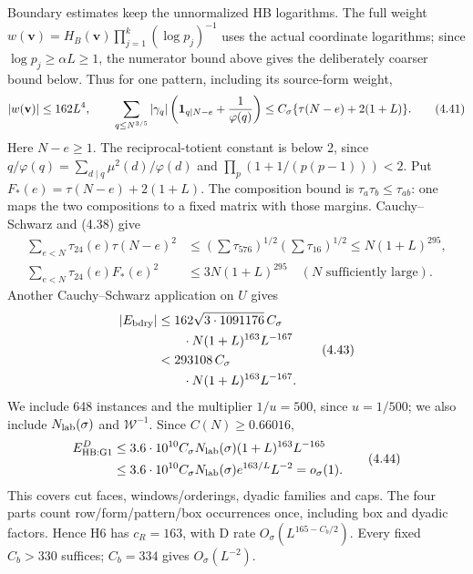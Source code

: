 Boundary estimates keep the unnormalized HB logarithms.
The full weight $w(\mathbf v)=H_B(\mathbf v)\prod_{j=1}^k(\log p_j)^{-1}$
uses the actual coordinate logarithms; since $\log p_j\ge\alpha L\ge1$,
the numerator bound above gives the deliberately coarser bound below.
Thus for one pattern, including its source-form weight,
\[
 |w(\mathbf v)|\le162L^4,\qquad
 \sum_{q\le N^{3/5}}|\gamma_q|
  \left(\mathbf1_{q\mid N-e}+{1\over\varphi(q)}\right)
 \le C_\sigma\{\tau(N-e)+2(1+L)\}.
 \tag{4.41}
\]
Here $N-e\ge1$.
The reciprocal-totient constant is below 2, since
$q/\varphi(q)=\sum_{d\mid q}\mu^2(d)/\varphi(d)$ and
$\prod_p(1+1/(p(p-1)))<2$.
Put $F_*(e)=\tau(N-e)+2(1+L)$.
The composition bound is $\tau_a\tau_b\le\tau_{ab}$:
one maps the two compositions to a fixed matrix with those margins.
Cauchy--Schwarz and (4.38) give
\[
\begin{aligned}
 \sum_{e<N}\tau_{24}(e)\tau(N-e)^2
 &\le\left(\sum\tau_{576}\right)^{1/2}
       \left(\sum\tau_{16}\right)^{1/2}
 \le N(1+L)^{295},\\
 \sum_{e<N}\tau_{24}(e)F_*(e)^2&\le3N(1+L)^{295}
                              \quad(N\text{ sufficiently large}).
\end{aligned}
 \tag{4.42}
\]
Another Cauchy--Schwarz application on $U$ gives
\[
\begin{aligned}
 |E_{\rm bdry}|&\le162\sqrt{3\cdot1091176}\,C_\sigma\\
 &\qquad\cdot N(1+L)^{163}L^{-167}\\
 &<293108\,C_\sigma\\
 &\qquad\cdot N(1+L)^{163}L^{-167}.
\end{aligned}
 \tag{4.43}
\]
We include 648 instances and the multiplier $1/u=500$, since $u=1/500$;
we also include $N_{\rm lab}(\sigma)$ and $\mathcal W^{-1}$.
Since $C(N)\ge0.66016$,
\[
\begin{aligned}
 E^D_{\rm HB:G1}&\le3.6\cdot10^{10}C_\sigma N_{\rm lab}(\sigma)
                     (1+L)^{163}L^{-165}\\
 &\le3.6\cdot10^{10}C_\sigma N_{\rm lab}(\sigma)
                         e^{163/L}L^{-2}=o_\sigma(1).
\end{aligned}
 \tag{4.44}
\]
This covers cut faces, windows/orderings, dyadic families and caps.
The four parts count row/form/pattern/box occurrences once, including box and dyadic factors.
Hence H6 has $c_R=163$, with D rate $O_\sigma(L^{165-C_b/2})$.
Every fixed $C_b>330$ suffices; $C_b=334$ gives $O_\sigma(L^{-2})$.

